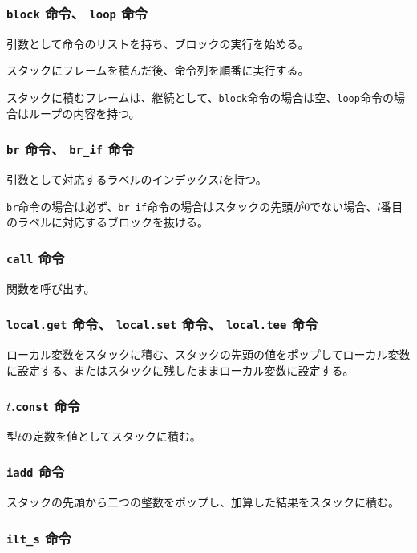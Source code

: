 \subsubsection{{\tt block} 命令、 {\tt loop} 命令}

引数として命令のリストを持ち、ブロックの実行を始める。

スタックにフレームを積んだ後、命令列を順番に実行する。

スタックに積むフレームは、継続として、\verb|block|命令の場合は空、\verb|loop|命令の場合はループの内容を持つ。

\subsubsection{{\tt br} 命令、 {\tt br\_if} 命令}

引数として対応するラベルのインデックス$l$を持つ。

\verb|br|命令の場合は必ず、\verb|br_if|命令の場合はスタックの先頭が0でない場合、$l$番目のラベルに対応するブロックを抜ける。

\subsubsection{{\tt call} 命令}

関数を呼び出す。

\subsubsection{{\tt local.get} 命令、 {\tt local.set} 命令、 {\tt local.tee} 命令}

ローカル変数をスタックに積む、スタックの先頭の値をポップしてローカル変数に設定する、またはスタックに残したままローカル変数に設定する。

\subsubsection{$t$.{\tt const} 命令}

型$t$の定数を値としてスタックに積む。

\subsubsection{{\tt iadd} 命令}

スタックの先頭から二つの整数をポップし、加算した結果をスタックに積む。

\subsubsection{{\tt ilt\_s} 命令}

